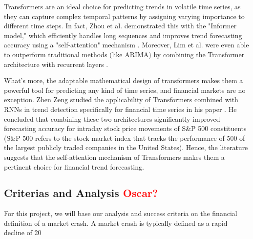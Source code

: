 \documentclass[12pt, letterpaper]{article}
\begin{document}
Transformers are an ideal choice for predicting trends in volatile time series, as they can capture complex temporal patterns by assigning varying importance to different time steps. In fact, Zhou et al. demonstrated this with the "Informer model," which efficiently handles long sequences and improves trend forecasting accuracy using a "self-attention" mechanism \cite{zhou2021informer}. Moreover, Lim et al. were even able to outperform traditional methods (like ARIMA) by combining the Transformer architecture with recurrent layers \cite{lim2021temporal}. 

What's more, the adaptable mathematical design of transformers makes them a powerful tool for predicting any kind of time series, and financial markets are no exception. Zhen Zeng studied the applicability of Transformers combined with RNNs in trend detection specifically for financial time series in his paper \cite{zeng2023financial}. He concluded that combining these two architectures significantly improved forecasting accuracy for intraday stock price movements of S\&P 500 constituents (S\&P 500 refers to the stock market index that tracks the performance of 500 of the largest publicly traded companies in the United States). Hence, the literature suggests that the self-attention mechanism of Transformers makes them a pertinent choice for financial trend forecasting.

\subsection*{Criterias and Analysis \textcolor{red}{Oscar?}}
For this project, we will base our analysis and success criteria on the financial definition of a market crash. A market crash is typically defined as a rapid decline of 20%

\pagebreak
\printbibliography

\end{document}
